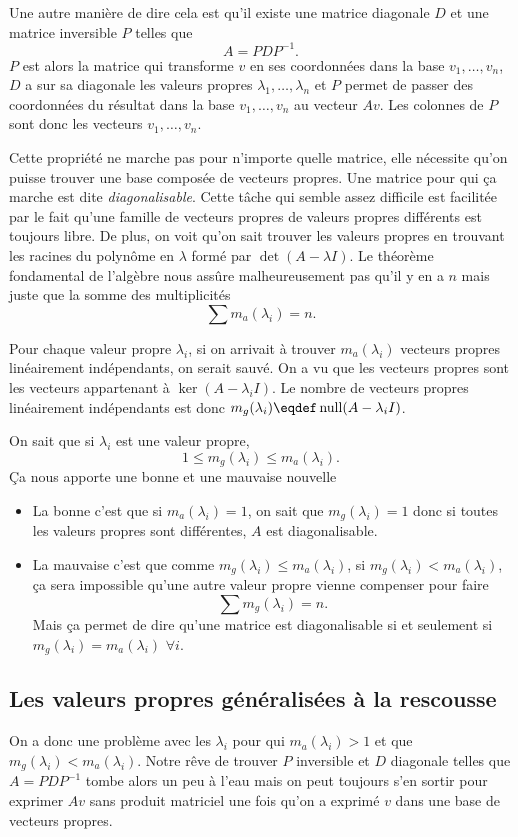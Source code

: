 Une autre manière de dire cela est qu'il existe une matrice
diagonale $D$ et une matrice inversible $P$ telles que
\[ A = PDP^{-1}. \]
$P$ est alors la matrice qui transforme $v$ en ses coordonnées dans
la base $v_1, \dots, v_n$, $D$ a sur sa diagonale les valeurs propres
$\lambda_1, \dots, \lambda_n$ et $P$ permet de passer des coordonnées
du résultat dans la base $v_1, \dots, v_n$ au vecteur $Av$.
Les colonnes de $P$ sont donc les vecteurs $v_1, \dots, v_n$.

Cette propriété ne marche pas pour n'importe quelle matrice,
elle nécessite qu'on puisse trouver une base composée de vecteurs propres.
Une matrice pour qui ça marche est dite \emph{diagonalisable}.
Cette tâche qui semble assez difficile est facilitée par le fait qu'une
famille de vecteurs propres de valeurs propres différents est toujours
libre.
De plus, on voit qu'on sait trouver les valeurs propres en trouvant les
racines du polynôme en $\lambda$ formé par $\det(A - \lambda I)$.
Le théorème fondamental de l'algèbre nous assûre malheureusement
pas qu'il y en a $n$ mais juste que la somme des multiplicités
\[ \sum m_a(\lambda_i) = n. \]

Pour chaque valeur propre $\lambda_i$,
si on arrivait à trouver $m_a(\lambda_i)$ vecteurs propres linéairement
indépendants, on serait sauvé.
On a vu que les vecteurs propres sont les vecteurs appartenant à
$\ker(A - \lambda_iI)$.
Le nombre de vecteurs propres linéairement indépendants est donc
$m_g(\lambda_i) \eqdef \newnull(A-\lambda_iI)$.

On sait que si $\lambda_i$ est une valeur propre,
\[ 1 \leq m_g(\lambda_i) \leq m_a(\lambda_i). \]
Ça nous apporte une bonne et une mauvaise nouvelle
\begin{itemize}
  \item La bonne c'est que si $m_a(\lambda_i) = 1$,
    on sait que $m_g(\lambda_i) = 1$ donc si toutes les valeurs propres
    sont différentes, $A$ est diagonalisable.
  \item La mauvaise c'est que comme $m_g(\lambda_i) \leq m_a(\lambda_i)$,
    si $m_g(\lambda_i) < m_a(\lambda_i)$, ça sera impossible qu'une
    autre valeur propre vienne compenser pour faire
    \[ \sum m_g(\lambda_i) = n. \]
    Mais ça permet de dire qu'une matrice est diagonalisable si et seulement
    si $m_g(\lambda_i) = m_a(\lambda_i)$ $\forall i$.
\end{itemize}

\subsection{Les valeurs propres généralisées à la rescousse}
On a donc une problème avec les $\lambda_i$ pour qui
$m_a(\lambda_i) > 1$ et que $m_g(\lambda_i) < m_a(\lambda_i)$.
Notre rêve de trouver $P$ inversible et $D$ diagonale
telles que $A = PDP^{-1}$ tombe alors un peu à l'eau mais
on peut toujours s'en sortir pour exprimer $Av$ sans produit matriciel
une fois qu'on a exprimé $v$ dans une base de vecteurs propres.

